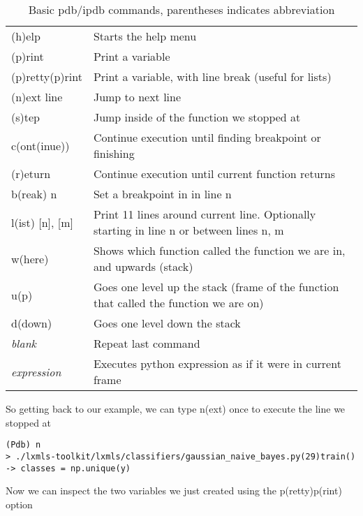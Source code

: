 \begin{table}[!h]
\begin{center}
\begin{tabular}{|l|l|}
\hline
(h)elp           & Starts the help menu\\
(p)rint          & Print a variable\\
(p)retty(p)rint	 & Print a variable, with line break (useful for lists)\\
\hline
(n)ext line      & Jump to next line\\ 
(s)tep           & Jump inside of the function we stopped at\\
c(ont(inue))     & Continue execution until finding breakpoint or finishing\\
(r)eturn         & Continue execution until current function returns\\
b(reak) n        & Set a breakpoint in in line n\\
\hline
l(ist) [n], [m]  & Print 11 lines around current line. Optionally starting in line n or between lines n, m\\
w(here)          & Shows which function called the function we are in, and upwards (stack\footnotemark)\\
u(p)             & Goes one level up the stack (frame of the function that called the function we are on)\\
d(down)          & Goes one level down the stack\\
\hline
\textit{blank}          & Repeat last command\\ 
\textit{expression}     & Executes python expression as if it were in current frame\\
\hline
\end{tabular}
\end{center}
\caption{\label{tb::pdbbasiccommands}Basic pdb/ipdb commands, parentheses indicates abbreviation}
\end{table}


So getting back to our example, we can type n(ext) once to execute the line we stopped at

\begin{verbatim}
(Pdb) n
> ./lxmls-toolkit/lxmls/classifiers/gaussian_naive_bayes.py(29)train()
-> classes = np.unique(y)
\end{verbatim}

Now we can inspect the two variables we just created using the p(retty)p(rint) option

